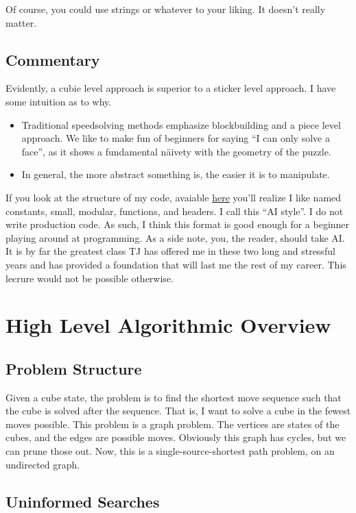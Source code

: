 \documentclass[11pt, oneside]{article}
\begin{document}
Of course, you could use strings or whatever to your liking. It doesn't really matter.

\subsection{Commentary}

Evidently, a cubie level approach is superior to a sticker level approach.
I have some intuition as to why.
\begin{itemize}
  \item Traditional speedsolving methods emphasize blockbuilding and a piece level approach.
  We like to make fun of beginners for saying ``I can only solve a face'', as it shows a fundamental
  näivety with the geometry of the puzzle.
  \item In general, the more abstract something is, the easier it is to manipulate.
\end{itemize}

If you look at the structure of my code, avaiable \href{https://github.com/stephen-huan/Cube-Solver}{here}
you'll realize I like named constants, small, modular, functions, and headers.
I call this ``AI style''. I do not write production code. As such, I think this format is good enough
for a beginner playing around at programming. As a side note, you, the reader, should take AI.
It is by far the greatest class TJ has offered me in these two long and stressful years and has provided
a foundation that will last me the rest of my career. This lecrure would not be possible otherwise.

\section{High Level Algorithmic Overview}

\subsection{Problem Structure}
Given a cube state, the problem is to find the shortest move sequence such that the cube is solved after the sequence.
That is, I want to solve a cube in the fewest moves possible.
This problem is a graph problem. The vertices are states of the cubes, and the edges are possible moves.
Obviously this graph has cycles, but we can prune those out. Now, this is a single-source-shortest path problem,
on an undirected graph.

\subsection{Uninformed Searches}
\end{document}
